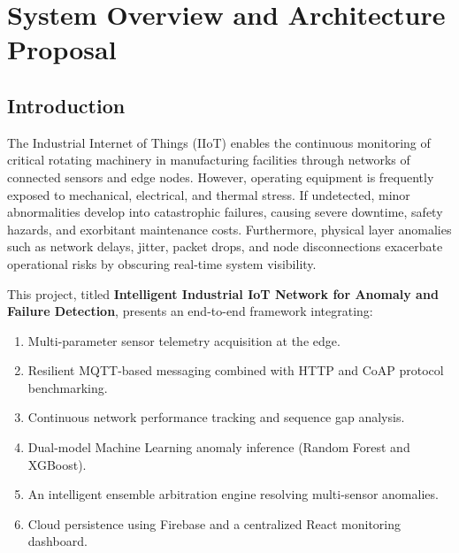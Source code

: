 \documentclass[12pt,a4paper]{report}
\begin{document}
\tableofcontents
\newpage

\chapter{System Overview and Architecture Proposal}

\section{Introduction}
The Industrial Internet of Things (IIoT) enables the continuous monitoring of critical rotating machinery in manufacturing facilities through networks of connected sensors and edge nodes. However, operating equipment is frequently exposed to mechanical, electrical, and thermal stress. If undetected, minor abnormalities develop into catastrophic failures, causing severe downtime, safety hazards, and exorbitant maintenance costs. Furthermore, physical layer anomalies such as network delays, jitter, packet drops, and node disconnections exacerbate operational risks by obscuring real-time system visibility.

This project, titled \textbf{Intelligent Industrial IoT Network for Anomaly and Failure Detection}, presents an end-to-end framework integrating:
\begin{enumerate}
    \item Multi-parameter sensor telemetry acquisition at the edge.
    \item Resilient MQTT-based messaging combined with HTTP and CoAP protocol benchmarking.
    \item Continuous network performance tracking and sequence gap analysis.
    \item Dual-model Machine Learning anomaly inference (Random Forest and XGBoost).
    \item An intelligent ensemble arbitration engine resolving multi-sensor anomalies.
    \item Cloud persistence using Firebase and a centralized React monitoring dashboard.
\end{enumerate}
\end{document}
